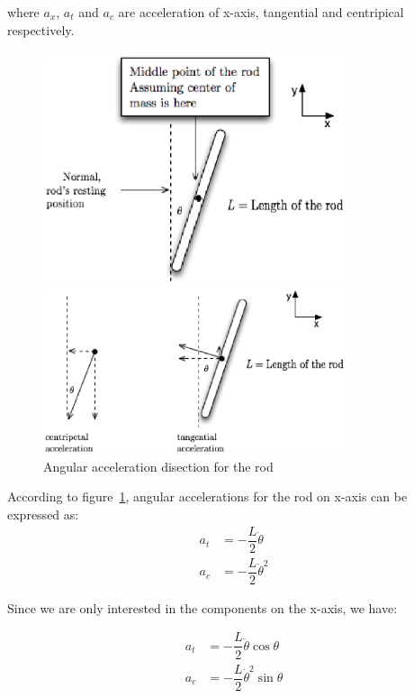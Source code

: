 \documentclass{notes}
\begin{document}
where $a_x$, $a_t$ and $a_c$ are acceleration of x-axis, tangential and centripical respectively. 

\begin{figure}[!h]
  \begin{center}
    \begin{minipage}[b]{3.5in}
      \centerline{\mbox{\includegraphics[width=3.5in]{pics/rod.eps}}}
    \end{minipage}
    \begin{minipage}[b]{3.5in}
      \centerline{\mbox{\includegraphics[width=3.5in]{pics/rod_acceleration.eps}}}
    \end{minipage}
    
  \end{center}
  \caption{Angular acceleration disection for the rod}
  \label{fig:angular_rod}
\end{figure}

According to figure~\ref{fig:angular_rod}, angular accelerations for the rod on x-axis can be
expressed as:
\begin{align*}
  a_t & = -\dfrac{L}{2} \ddot{\theta} \\
  a_c & = -\dfrac{L}{2} \dot{\theta}^2
\end{align*}

Since we are only interested in the components on the x-axis, we have:

\begin{align*}
  a_t & = -\dfrac{L}{2} \ddot{\theta} \cos \theta \\
  a_c & = -\dfrac{L}{2} \dot{\theta}^2 \sin \theta
\end{align*}
\end{document}
